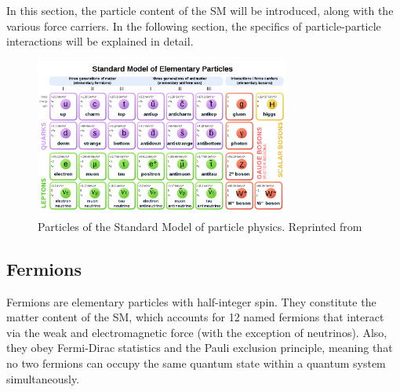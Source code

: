 In this section, the particle content of the SM will be introduced, along with the various force carriers. In the following section, the specifics of particle-particle interactions will be explained in detail.

    \begin{figure}[h]
 	\centering
 	\includegraphics[width=0.75\textwidth]{figures/SMall.png}
 	\singlespace
 	\caption{Particles of the Standard Model of particle physics. Reprinted from \cite{StandardModelDiagram}}
 	\label{fig:stdmcer}
	\end{figure}

\subsection{Fermions}
Fermions are elementary particles with half-integer spin. They constitute the matter content of the SM, which accounts for 12 named fermions that interact via the weak and electromagnetic force (with the exception of neutrinos). Also, they obey Fermi-Dirac statistics and the Pauli exclusion principle, meaning that no two fermions can occupy the same quantum state within a quantum system simultaneously.



